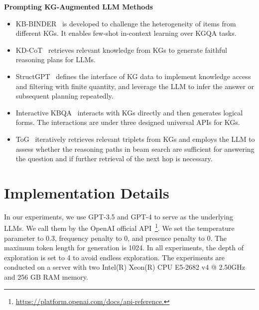 \documentclass{article}
\begin{document}
\noindent \textbf{Prompting KG-Augmented LLM Methods}
\begin{itemize}[leftmargin=1cm] 
    \item KB-BINDER~\cite{li2023few} is developed to challenge the heterogeneity of items from different KGs. It enables few-shot in-context learning over KGQA tasks.
    \item KD-CoT~\cite{wang2023knowledge} retrieves relevant knowledge from KGs to generate faithful reasoning plans for LLMs.
    \item 
    StructGPT~\cite{jiang2023structgpt} defines the interface of KG data to implement knowledge access and filtering with finite quantity, and leverage the LLM to infer the answer or subsequent planning repeatedly.

    \item Interactive KBQA~\cite{xiong2024interactive} interacts with KGs directly and then generates logical forms. The interactions are under three designed universal APIs for KGs.
    \item ToG~\cite{sun2024think} iteratively retrieves relevant triplets from KGs and employs the LLM to assess whether the reasoning paths in beam search are sufficient for answering the question and if further retrieval of the next hop is necessary.
\end{itemize}

\section{Implementation Details} 
\label{modelset}
In our experiments, we use GPT-3.5 and GPT-4 to serve as the underlying LLMs. We call them by the OpenAI official API~\footnote{\url{https://platform.openai.com/docs/api-reference.}}.
We set the temperature parameter to 0.3, frequency penalty to 0, and presence penalty to 0.
The maximum token length for generation is 1024. In all experiments, the depth of exploration is set to 4 to avoid endless exploration.
The experiments are conducted on a server with two 
Intel(R) Xeon(R) CPU E5-2682 v4 @ 2.50GHz and 256 GB RAM memory.
\end{document}
